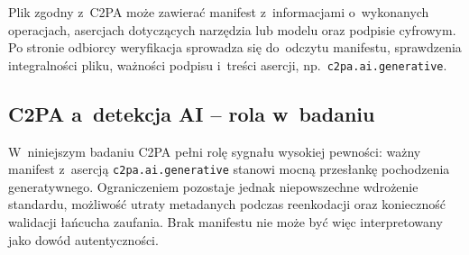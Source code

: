 Plik zgodny z~C2PA mo\.{z}e zawiera\'{c} manifest z~informacjami
o~wykonanych operacjach, asercjach dotycz\k{a}cych narz\k{e}dzia lub modelu
oraz podpisie cyfrowym. Po stronie odbiorcy weryfikacja sprowadza si\k{e}
do~odczytu manifestu, sprawdzenia integralno\'{s}ci pliku, wa\.{z}no\'{s}ci
podpisu i~tre\'{s}ci asercji, np.\ \texttt{c2pa.ai.generative}.

\subsection{C2PA a~detekcja AI -- rola w~badaniu}
\label{sec:c2pa_detekcja}

W~niniejszym badaniu C2PA pe\l{}ni rol\k{e} sygna\l{}u wysokiej pewno\'{s}ci:
wa\.{z}ny manifest z~asercj\k{a} \texttt{c2pa.ai.generative} stanowi
mocn\k{a} przes\l{}ank\k{e} pochodzenia generatywnego. Ograniczeniem pozostaje
jednak niepowszechne wdro\.{z}enie standardu, mo\.{z}liwo\'{s}\'{c} utraty
metadanych podczas reenkodacji oraz konieczno\'{s}\'{c} walidacji \l{}a\'{n}cucha
zaufania. Brak manifestu nie mo\.{z}e by\'{c} wi\k{e}c interpretowany
jako dow\'{o}d autentyczno\'{s}ci.
